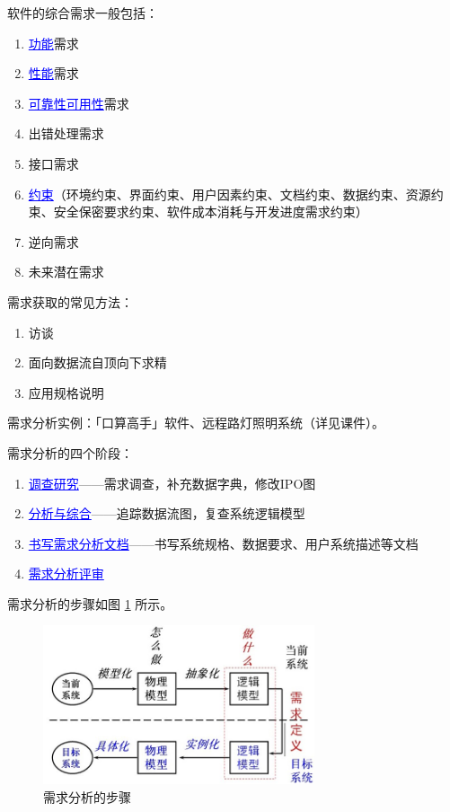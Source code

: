 \documentclass[UTF8]{ctexart}
\newcommand\Point[1]{\textcolor{blue}{\uline{#1}}} %
\begin{document}
软件的综合需求一般包括：
\begin{enumerate}
    \item \Point{功能}需求
    \item \Point{性能}需求
    \item \Point{可靠性可用性}需求
    \item 出错处理需求
    \item 接口需求
    \item \Point{约束}（环境约束、界面约束、用户因素约束、文档约束、数据约束、资源约束、安全保密要求约束、软件成本消耗与开发进度需求约束）
    \item 逆向需求
    \item 未来潜在需求
\end{enumerate}

需求获取的常见方法：
\begin{enumerate}
    \item 访谈
    \item 面向数据流自顶向下求精
    \item 应用规格说明
\end{enumerate}

需求分析实例：「口算高手」软件、远程路灯照明系统（详见课件）。

需求分析的四个阶段：
\begin{enumerate}
    \item \Point{调查研究}——需求调查，补充数据字典，修改IPO图
    \item \Point{分析与综合}——追踪数据流图，复查系统逻辑模型
    \item \Point{书写需求分析文档}——书写系统规格、数据要求、用户系统描述等文档
    \item \Point{需求分析评审}
\end{enumerate}

需求分析的步骤如图 \ref{fig:Demand_Analysis} 所示。
\begin{figure}[htb]
    \centering
    \includegraphics[width=8cm]{需求分析.jpg}
    \caption{需求分析的步骤}\label{fig:Demand_Analysis}
\end{figure}
\end{document}
